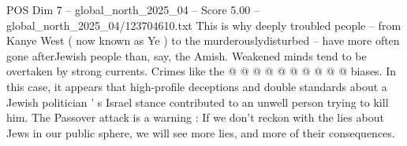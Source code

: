 \begin{textsample}{POS Dim 7 – global\_north\_2025\_04 – Score 5.00 – global\_north\_2025\_04/123704610.txt}
This is why deeply troubled people -- from Kanye West ( now known as Ye ) to the murderouslydisturbed -- have more often gone afterJewish people than, say, the Amish.
Weakened minds tend to be overtaken by strong currents.
Crimes like the @ @ @ @ @ @ @ @ @ @ biases.
In this case, it appears that high-profile deceptions and double standards about a Jewish politician ' s Israel stance contributed to an unwell person trying to kill him.
The Passover attack is a warning : If we don't reckon with the lies about Jews in our public sphere, we will see more lies, and more of their consequences.

\end{textsample}
